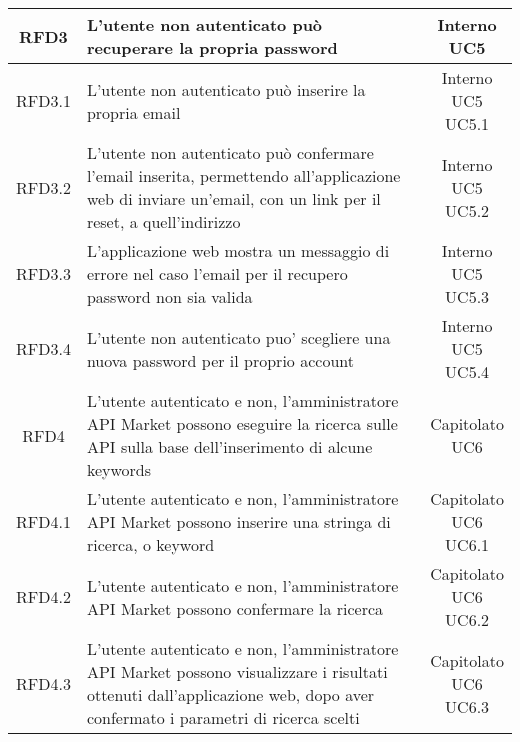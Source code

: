\begin{longtable}{|c|p{8cm}|c|}
RFD3 & L'utente non autenticato può recuperare la propria password & \makecell*{Interno\\UC5} \\
\hline

RFD3.1 & L'utente non autenticato può inserire la propria email & \makecell*{Interno\\UC5\\UC5.1} \\
\hline
RFD3.2 & L'utente non autenticato può confermare l'email inserita, permettendo all'applicazione web di inviare un'email, con un link per il reset, a quell'indirizzo & \makecell*{Interno\\UC5\\UC5.2} \\
\hline
RFD3.3 & L'applicazione web mostra un messaggio di errore nel caso l'email per il recupero password non sia valida & \makecell*{Interno\\UC5\\UC5.3} \\
\hline

\hline
RFD3.4 & L'utente non autenticato puo' scegliere una nuova password per il proprio account & \makecell*{Interno\\UC5\\UC5.4} \\
\hline

RFD4 & L'utente autenticato e non, l'amministratore API Market possono eseguire la ricerca sulle API sulla base dell'inserimento di alcune keywords & \makecell*{Capitolato\\UC6} \\
\hline

RFD4.1 & L'utente autenticato e non, l'amministratore API Market possono inserire una stringa di ricerca, o keyword & \makecell*{Capitolato\\UC6\\UC6.1} \\
\hline

RFD4.2 & L'utente autenticato e non, l'amministratore API Market possono confermare la ricerca  & \makecell*{Capitolato\\UC6\\UC6.2} \\
\hline
RFD4.3 & L'utente autenticato e non, l'amministratore API Market possono visualizzare i risultati ottenuti dall'applicazione web, dopo aver confermato i parametri di ricerca scelti & \makecell*{Capitolato\\UC6\\UC6.3} \\
\hline


\end{longtable}
